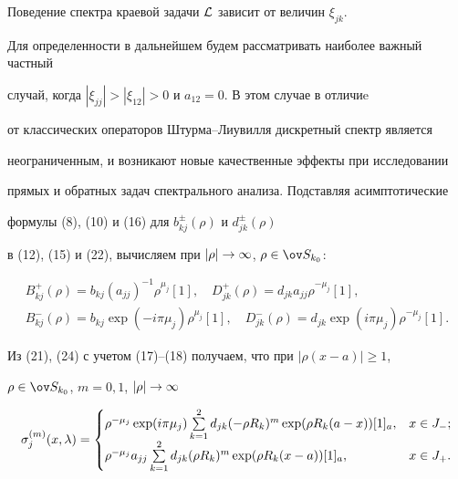 Поведение спектра краевой задачи ${\cal L}$ зависит от величин $\xi_{jk}$.


Для определенности в дальнейшем будем рассматривать наиболее важный частный


случай, когда $|\xi_{jj}|>|\xi_{12}|>0$ и $a_{12}=0$. В этом случае в отличиe


от классических операторов Штурма--Лиувилля дискретный спектр является


неограниченным, и возникают новые качественные эффекты при исследовании


прямых и обратных задач спектрального анализа. Подставляя асимптотические


формулы (8), (10) и (16) для $b_{kj}^{\pm}(\rho)$ и $d_{jk}^{\pm}(\rho)$


в (12), (15) и (22), вычисляем при $|\rho|\to\infty$, $\rho\in\ov S_{k_0}$:


\begin{equation}


\begin{array}{c}


B_{kj}^{+}(\rho)=b_{kj}(a_{jj})^{-1}\rho^{\mu_j}[1],\quad


D_{jk}^{+}(\rho)=d_{jk}a_{jj}\rho^{-\mu_j}[1], \\[2mm]


B_{kj}^{-}(\rho)=b_{kj}\exp(-i\pi\mu_j)\rho^{\mu_j}[1],\quad


D_{jk}^{-}(\rho)=d_{jk}\exp(i\pi\mu_j)\rho^{-\mu_j}[1].


\end{array}


\end{equation}





Из (21), (24) с учетом (17)--(18) получаем, что при $|\rho(x-a)|\ge 1$,


$\rho\in\ov S_{k_0}$, $m=0,1$, $|\rho|\to\infty$


\begin{equation}


\sigma_j^{(m)}(x,\la)=


\begin{cases}


\rho^{-\mu_j}\exp(i\pi\mu_j) \sum\limits_{k=1}^2


d_{jk}(-\rho R_k)^m \exp(\rho R_k(a-x))[1]_a, & x\in J_{-};\\


\rho^{-\mu_j}a_{jj} \sum\limits_{k=1}^2


d_{jk}(\rho R_k)^m \exp(\rho R_k(x-a))[1]_a,  & x\in J_{+}.


\end{cases}


\end{equation}


